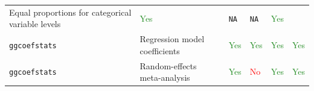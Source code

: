 \documentclass[
]{article}
\begin{document}
\begin{longtable}[]{@{}llllll@{}}
\begin{minipage}[t]{0.35\columnwidth}
Equal proportions for categorical variable levels\strut
\end{minipage} & \begin{minipage}[t]{0.08\columnwidth}\raggedright
\textcolor{ForestGreen}{Yes}\strut
\end{minipage} & \begin{minipage}[t]{0.10\columnwidth}\raggedright
\texttt{NA}\strut
\end{minipage} & \begin{minipage}[t]{0.08\columnwidth}\raggedright
\texttt{NA}\strut
\end{minipage} & \begin{minipage}[t]{0.10\columnwidth}\raggedright
\textcolor{ForestGreen}{Yes}\strut
\end{minipage}\tabularnewline
\begin{minipage}[t]{0.14\columnwidth}\raggedright
\texttt{ggcoefstats}\strut
\end{minipage} & \begin{minipage}[t]{0.35\columnwidth}\raggedright
Regression model coefficients\strut
\end{minipage} & \begin{minipage}[t]{0.08\columnwidth}\raggedright
\textcolor{ForestGreen}{Yes}\strut
\end{minipage} & \begin{minipage}[t]{0.10\columnwidth}\raggedright
\textcolor{ForestGreen}{Yes}\strut
\end{minipage} & \begin{minipage}[t]{0.08\columnwidth}\raggedright
\textcolor{ForestGreen}{Yes}\strut
\end{minipage} & \begin{minipage}[t]{0.10\columnwidth}\raggedright
\textcolor{ForestGreen}{Yes}\strut
\end{minipage}\tabularnewline
\begin{minipage}[t]{0.14\columnwidth}\raggedright
\texttt{ggcoefstats}\strut
\end{minipage} & \begin{minipage}[t]{0.35\columnwidth}\raggedright
Random-effects meta-analysis\strut
\end{minipage} & \begin{minipage}[t]{0.08\columnwidth}\raggedright
\textcolor{ForestGreen}{Yes}\strut
\end{minipage} & \begin{minipage}[t]{0.10\columnwidth}\raggedright
\textcolor{red}{No}\strut
\end{minipage} & \begin{minipage}[t]{0.08\columnwidth}\raggedright
\textcolor{ForestGreen}{Yes}\strut
\end{minipage} & \begin{minipage}[t]{0.10\columnwidth}\raggedright
\textcolor{ForestGreen}{Yes}\strut
\end{minipage}\tabularnewline
\bottomrule
\end{longtable}
\end{document}
